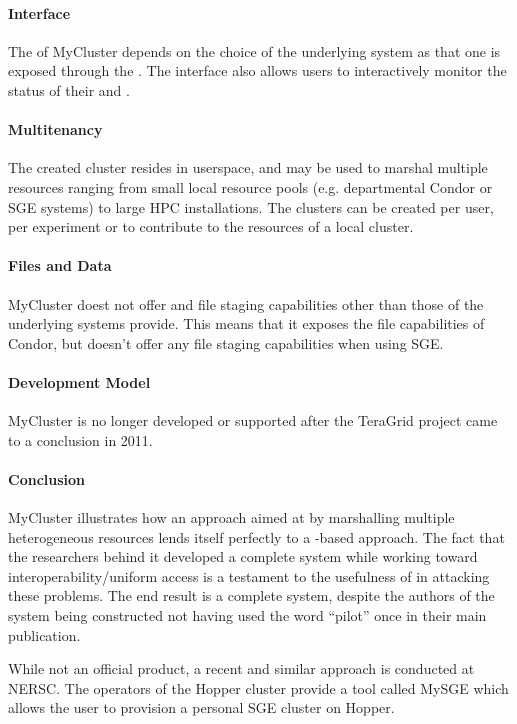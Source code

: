 \documentclass{sig-alternate}
\begin{document}
\paragraph{Interface}
The  of MyCluster depends on the choice of the underlying
system as that one is exposed through the .
The interface also allows users to interactively monitor the status of their
\vocab{\pilots} and .

\paragraph{Multitenancy}
The created cluster resides in userspace, and may be used to marshal multiple
resources ranging from small local resource pools (e.g.  departmental Condor or
SGE systems) to large HPC installations.
The clusters can be created per user, per experiment or to contribute to
the resources of a local cluster.

\paragraph{Files and Data}
MyCluster doest not offer and file staging capabilities other than those of the
underlying systems provide. This means that it exposes the file capabilities of
Condor, but doesn't offer any file staging capabilities when using SGE.

\paragraph{Development Model}
MyCluster is no longer developed or supported after the TeraGrid project came
to a conclusion in 2011.

\paragraph{Conclusion}
MyCluster illustrates how an approach aimed at 
by marshalling multiple heterogeneous resources lends itself perfectly to a
\pilot-based approach.
The fact that the researchers behind it developed a complete \pilot system
while working toward interoperability/uniform access is a testament to the
usefulness of \pilots in attacking these problems.
The end result is a complete \pilot system, despite the authors of the system
being constructed not having used the word ``pilot'' once in their main
publication.

While not an official product, a recent and similar approach is conducted at
NERSC. The operators of the Hopper cluster provide a tool called MySGE which
allows the user to provision a personal SGE cluster on Hopper.
\end{document}
